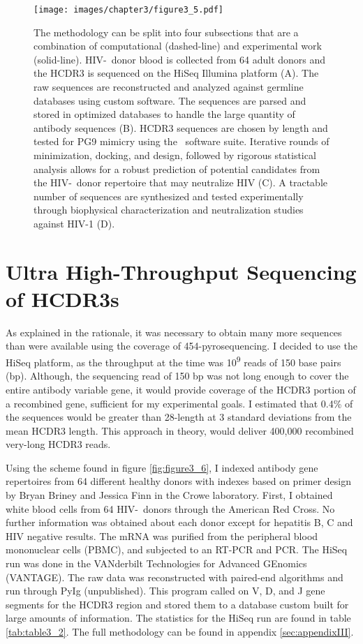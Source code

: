 \begin{figure}[!t]
   \centering
   \texttt{[image: images/chapter3/figure3\_5.pdf]} %
   \caption[Overview of Methodology ]{The methodology can be split into four subsections that are a combination of computational (dashed-line) and experimental work (solid-line). HIV-\naive~donor blood is collected from 64 adult donors and the HCDR3 is sequenced on the HiSeq Illumina platform (A). The raw sequences are reconstructed and analyzed against germline databases using custom software. The sequences are parsed and stored in optimized databases to handle the large quantity of antibody sequences (B). HCDR3 sequences are chosen by length and tested for PG9 mimicry using the \rosetta~software suite. Iterative rounds of minimization, docking, and design, followed by rigorous statistical analysis allows for a robust prediction of potential candidates from the HIV-\naive~donor repertoire that may neutralize HIV (C). A tractable number of sequences are synthesized and tested experimentally through biophysical characterization and neutralization studies against HIV-1 (D).}
   \label{fig:figure3_5}
\end{figure}

\section{Ultra High-Throughput Sequencing of HCDR3s}
As explained in the rationale, it was necessary to obtain many more sequences than were available using the coverage of 454-pyrosequencing. I decided to use the HiSeq platform, as the throughput at the time was 10\textsuperscript{9} reads of 150 base pairs (bp). Although, the sequencing read of 150 bp was not long enough to cover the entire antibody variable gene, it would provide coverage of the HCDR3 portion of a recombined gene, sufficient for my experimental goals. I estimated that 0.4\% of the sequences would be greater than 28-length at 3 standard deviations from the mean HCDR3 length. This approach in theory, would deliver 400,000 recombined very-long HCDR3 reads.

Using the scheme found in figure \ref{fig:figure3_6}, I indexed antibody gene repertoires from 64 different healthy donors with indexes based on primer design by Bryan Briney and Jessica Finn in the Crowe laboratory. First, I obtained white blood cells from 64 HIV-\naive~donors through the American Red Cross. No further information was obtained about each donor except for hepatitis B, C and HIV negative results. The mRNA was purified from the peripheral blood mononuclear cells (PBMC), and subjected to an RT-PCR and PCR. The HiSeq run was done in the VANderbilt Technologies for Advanced GEnomics (VANTAGE). The raw data was reconstructed with paired-end algorithms and run through PyIg (unpublished). This program called on V, D, and J gene segments for the HCDR3 region and stored them to a database custom built for large amounts of information. The statistics for the HiSeq run are found in table \ref{tab:table3_2}.  The full methodology can be found in appendix \ref{sec:appendixIII}.

